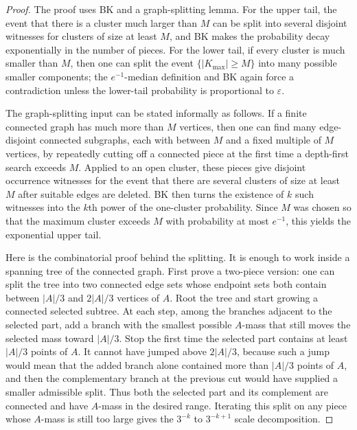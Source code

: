 \documentclass[11pt,reqno]{book}
\numberwithin{equation}{chapter}
\theoremstyle{plain}
\theoremstyle{definition}
\theoremstyle{remark}
\newcommand{\eps}{\varepsilon}
\newcommand{\1}{\mathbf 1}
\begin{document}
\begin{proof}
The proof uses BK and a graph-splitting lemma. For the upper tail, the event that there is a cluster much larger than $M$ can be split into several disjoint witnesses for clusters of size at least $M$, and BK makes the probability decay exponentially in the number of pieces. For the lower tail, if every cluster is much smaller than $M$, then one can split the event $\{|K_{\max}|\geq M\}$ into many possible smaller components; the $e^{-1}$-median definition and BK again force a contradiction unless the lower-tail probability is proportional to $\eps$.

The graph-splitting input can be stated informally as follows. If a finite connected graph has much more than \(M\) vertices, then one can find many edge-disjoint connected subgraphs, each with between \(M\) and a fixed multiple of \(M\) vertices, by repeatedly cutting off a connected piece at the first time a depth-first search exceeds \(M\). Applied to an open cluster, these pieces give disjoint occurrence witnesses for the event that there are several clusters of size at least \(M\) after suitable edges are deleted. BK then turns the existence of \(k\) such witnesses into the \(k\)th power of the one-cluster probability. Since \(M\) was chosen so that the maximum cluster exceeds \(M\) with probability at most \(e^{-1}\), this yields the exponential upper tail.

Here is the combinatorial proof behind the splitting. It is enough to work
inside a spanning tree of the connected graph. First prove a two-piece
version: one can split the tree into two connected edge sets whose endpoint
sets both contain between \(|A|/3\) and \(2|A|/3\) vertices of \(A\). Root the
tree and start growing a connected selected subtree. At each step, among the
branches adjacent to the selected part, add a branch with the smallest
possible \(A\)-mass that still moves the selected mass toward \(|A|/3\). Stop
the first time the selected part contains at least \(|A|/3\) points of \(A\).
It cannot have jumped above \(2|A|/3\), because such a jump would mean that
the added branch alone contained more than \(|A|/3\) points of \(A\), and then
the complementary branch at the previous cut would have supplied a smaller
admissible split. Thus both the selected part and its complement are
connected and have \(A\)-mass in the desired range. Iterating this split on
any piece whose \(A\)-mass is still too large gives the \(3^{-k}\) to
\(3^{-k+1}\) scale decomposition.


\end{proof}
\end{document}
